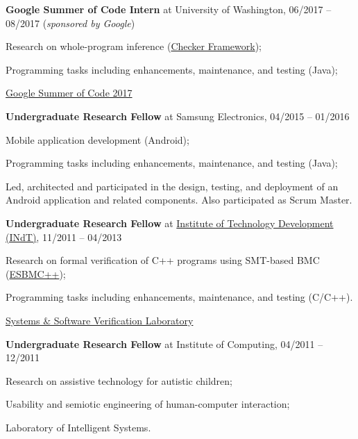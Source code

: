 \documentclass[letterpaper]{article}
\renewenvironment{itemize}{
  \begin{list}{}{
    \setlength{\leftmargin}{1.5em}
  }
}{
  \end{list}
}
\begin{document}
\begin{enumerate}
\begin{itemize}
      \end{itemize}
      \item{{\bf Google Summer of Code Intern} at University of Washington, 06/2017 -- 08/2017 ({\it sponsored by Google})} 
      \begin{itemize}
        \item{\textendash} {Research on whole-program inference (\href{https://checkerframework.org/}{Checker Framework});}
        \item{\textendash} {Programming tasks including enhancements, maintenance, and testing (Java);}
        \item{\textendash} \href{https://summerofcode.withgoogle.com/archive/2017/projects/6689181245898752/}{Google Summer of Code 2017}
      \end{itemize}
      \item{{\bf Undergraduate Research Fellow} at Samsung Electronics, 04/2015 -- 01/2016}
      \begin{itemize}
        \item{\textendash} {Mobile application development (Android);}
        \item{\textendash} {Programming tasks including enhancements, maintenance, and testing (Java);}
        \item{\textendash} {Led, architected and participated in the design, testing, and deployment of an Android application and related components. Also participated as Scrum Master.}
      \end{itemize}
      \item{{\bf Undergraduate Research Fellow} at \href{http://www.indt.org.br}{Institute of Technology Development (INdT)}, 11/2011 -- 04/2013}
            \begin{itemize}
        \item{\textendash} {Research on formal verification of C++ programs using SMT-based BMC (\href{http://www.esbmc/}{ESBMC++});}
        \item{\textendash} {Programming tasks including enhancements, maintenance, and testing (C/C++).}
        \item{\textendash} \href{https://ssvlab.github.io}{Systems \& Software Verification Laboratory}
      \end{itemize}
      \item{{\bf Undergraduate Research Fellow} at Institute of Computing, 04/2011 -- 12/2011}
            \begin{itemize}
        \item{\textendash} {Research on assistive technology for autistic children;}
        \item{\textendash} {Usability and semiotic engineering of human-computer interaction;}
        \item{\textendash} {Laboratory of Intelligent Systems.}
      \end{itemize}
    \end{enumerate}
    
\end{document}
